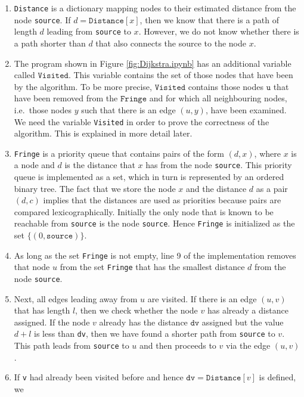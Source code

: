 \begin{enumerate}
\item \texttt{Distance} is a dictionary mapping nodes to their estimated distance from the node
      \texttt{source}.  If $d = \texttt{Distance}[x]$, then we know that there is a path of length $d$ leading
      from \texttt{source} to $x$.  However, we do not know whether there is a path shorter
      than $d$ that also connects the source to the node $x$.
\item The program shown in Figure \ref{fig:Dijkstra.ipynb} has an additional variable called $\texttt{Visited}$.
      This variable contains the set of those nodes that have been   by the algorithm.
      To be more precise, $\texttt{Visited}$ contains those nodes $\texttt{u}$ that have been removed from the
      $\texttt{Fringe}$ and for which all neighbouring nodes, i.e.~those nodes $y$ such that
      there is an edge $(u,y)$, have been examined.  We need the variable \texttt{Visited} in order to prove
      the correctness of the algorithm.  This is explained in more detail later.
\item \texttt{Fringe} is a priority queue that contains pairs of the form $(d, x)$, where $x$ is a node and $d$
      is the distance that $x$ has from the node \texttt{source}.  This priority queue is implemented as a set,
      which in turn is represented by an ordered binary tree.  The fact that we store the node $x$ and the
      distance $d$ as a pair $(d,c)$ implies that the distances are used as priorities because pairs are
      compared lexicographically.
      Initially the only node that is known to be
      reachable from \texttt{source} is the node \texttt{source}.  Hence \texttt{Fringe} is initialized as the
      set $\{ (0, \texttt{source}) \}$.
\item As long as the set \texttt{Fringe} is not empty, line 9 of the implementation removes that node $u$
      from the set \texttt{Fringe} that has the smallest distance $d$ from the node \texttt{source}.
\item Next, all edges leading away from $u$ are visited.  If there is an edge $(u, v)$ that has length $l$,
      then we check whether the node $v$ has already a distance assigned.  If the node $v$ already has the
      distance $\texttt{dv}$ assigned but the value $d + l$ is less than \texttt{dv}, then we have found a
      shorter path from \texttt{source} to $v$.  This path leads from \texttt{source} to $u$ and then proceeds
      to $v$ via the edge $(u,v)$.
\item If \texttt{v} had already been visited before and hence $\texttt{dv}=\texttt{Distance}[v]$ is defined, we

\end{enumerate}
